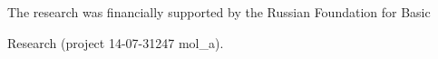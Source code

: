 









\Ack


\noindent


The research was financially supported by the Russian Foundation for Basic


Research (project 14-07-31247 mol\_a).








\renewcommand{\bibname}{\protect\rmfamily References}







